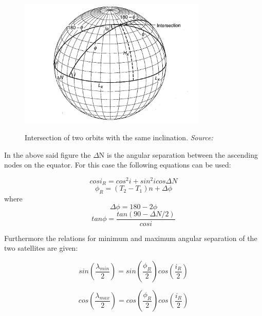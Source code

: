 \documentclass[11pt]{report}
\begin{document}
\begin{figure}[ht!]
\centering
\includegraphics[width=0.8\textwidth, angle=0]{img/intersection.png}
\label{fig:intersection}
\caption{Intersection of two orbits with the same inclination. \emph{Source: \cite{constDesign}}}
\end{figure}

In the above said figure the $\Delta$N is the angular separation between the ascending nodes on the equator. For this case the following equations can be used:

\begin{equation}
cos i_R = cos^2i+sin^2i cos \Delta N
\label{ir}
\end{equation}
\begin{equation}
\phi_R = (T_2-T_1)n+ \Delta \phi
\label{phir}
\end{equation}
where
\begin{equation}
\Delta \phi = 180 - 2 \phi
\label{deltaPhi}
\end{equation}
\begin{equation}
tan \phi = \frac{tan ( 90 - \Delta N / 2)}{cos i}
\label{tanphi}
\end{equation}

Furthermore the relations for minimum and maximum angular separation of the two satellites are given:

\begin{equation}
sin ( \frac{\lambda_{min}}{2} ) = sin ( \frac{ \phi_R }{2} ) cos ( \frac{i_R}{2} )
\label{lambdamin}
\end{equation}

\begin{equation}
cos ( \frac{\lambda_{max}}{2} ) = cos ( \frac{ \phi_R }{2} ) cos ( \frac{i_R}{2} )
\label{lambdamax}
\end{equation}
\end{document}
